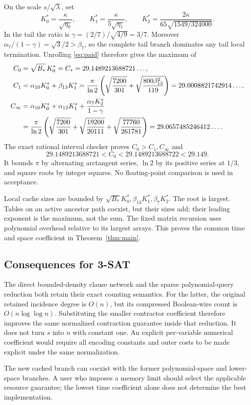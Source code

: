 On the scale \(s/\sqrt\lambda\), set
\[
 K_0^*=\frac{\kappa}{\sqrt{\eta_0}},\qquad
 K_1^*=\frac{\kappa}{5\sqrt{\eta_1}},\qquad
 K_2^*=\frac{2\kappa}{65\sqrt{1549/324000}}.
\]
In the tail the ratio is
\(\gamma=(2/7)/\sqrt{4/9}=3/7\).
Moreover
\(\alpha_7/(1-\gamma)=\sqrt3/2>\beta_7\), so the complete tail
branch dominates any tail local termination.
Unrolling \eqref{eq:paid} therefore gives the maximum of
\begin{align}
 C_0&=\sqrt{B_*}\,K_0^*=C_*=29.1489213688721\ldots,\label{eq:c0}\\
 C_1&=\alpha_{10}K_0^*+\beta_{13}K_1^*
   =\frac\pi{\ln2}\left(
        \sqrt{\frac{7200}{301}}+
        \sqrt{\frac{800\beta_{13}^2}{119}}\right)
   =29.0008821742914\ldots,\label{eq:c1}\\
 C_\infty&=\alpha_{10}K_0^*+\alpha_{13}K_1^*
       +\frac{\alpha_7K_2^*}{1-\gamma}\notag\\
   &=\frac\pi{\ln2}\left(
        \sqrt{\frac{7200}{301}}+
        \sqrt{\frac{19200}{20111}}+
        \sqrt{\frac{77760}{261781}}\right)
   =29.0657485246412\ldots.\label{eq:cinf}
\end{align}
The exact rational interval checker proves \(C_0>C_1,C_\infty\) and
\[
 29.1489213688721<C_0<29.1489213688722<29.149.
\]
It bounds \(\pi\) by alternating arctangent series, \(\ln2\) by its
positive series at \(1/3\), and square roots by integer squares.
No floating-point comparison is used in acceptance.

Local cache sizes are bounded by
\(\sqrt{B_*}K_0^*,\beta_{13}K_1^*,\beta_7K_2^*\).
The root is largest. Tables on an active ancestor path coexist, but their
sizes add; their leading exponent is the maximum, not the sum.
The fixed matrix recursion uses polynomial overhead relative to its
largest arrays. This proves the common time and space coefficient in
Theorem~\ref{thm:main}.

\subsection{Consequences for 3-SAT}

The direct bounded-density clause network and the sparse polynomial-query
reduction both retain their exact counting semantics.
For the latter, the original retained incidence degree is \(O(n)\),
but its compressed Boolean-wire count is \(O(n\log\log n)\).
Substituting the smaller contractor coefficient therefore improves the
same normalized contraction guarantee inside that reduction.
It does not turn \(s\) into \(n\) with constant one.
An explicit per-variable numerical coefficient would require all encoding
constants and outer costs to be made explicit under the same normalization.

The new cached branch can coexist with the former polynomial-space and
lower-space branches. A user who imposes a memory limit should select
the applicable resource guarantee; the lowest time coefficient alone
does not determine the best implementation.

